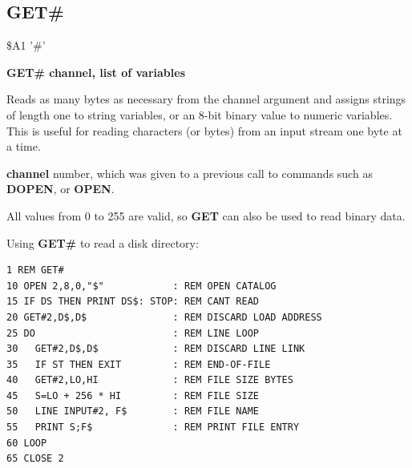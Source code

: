 \subsection{GET\#}
\begin{description}[leftmargin=2cm,style=nextline]
\item [Token:] \$A1 '\#'
\item [Format:] {\bf GET\# channel, list of variables}
\item [Usage:] Reads as many bytes
               as necessary from the channel argument
               and assigns strings of length one to
               string variables, or an 8-bit binary value
               to numeric variables.
               This is useful for reading characters (or bytes) from
               an input stream one byte at a time.

               {\bf channel} number, which was given to a previous
               call to commands such as {\bf DOPEN}, or {\bf OPEN}.


\item [Remarks:] All values from 0 to 255 are valid, so {\bf GET}
                 can also be used to read binary data.

\item [Example:] Using {\bf GET\#} to read a disk directory:
\begin{tcolorbox}[colback=black,coltext=white]
\verbatimfont{\codefont}
\begin{verbatim}
1 REM GET#
10 OPEN 2,8,0,"$"            : REM OPEN CATALOG
15 IF DS THEN PRINT DS$: STOP: REM CANT READ
20 GET#2,D$,D$               : REM DISCARD LOAD ADDRESS
25 DO                        : REM LINE LOOP
30   GET#2,D$,D$             : REM DISCARD LINE LINK
35   IF ST THEN EXIT         : REM END-OF-FILE
40   GET#2,LO,HI             : REM FILE SIZE BYTES
45   S=LO + 256 * HI         : REM FILE SIZE
50   LINE INPUT#2, F$        : REM FILE NAME
55   PRINT S;F$              : REM PRINT FILE ENTRY
60 LOOP
65 CLOSE 2
\end{verbatim}
\end{tcolorbox}
\end{description}


\newpage
